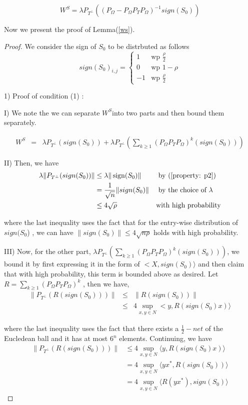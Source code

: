 \[
W^{S}=\lambda P_{T^{\bot}}((P_{\Omega}-P_{\Omega}P_{T}P_{\Omega})^{-1}sign(S_{0}))
\]

Now we present the proof of Lemma(\ref{ws}).
\begin{proof}
We consider the sign of $S_{0}$ to be distrbuted as follows
\[
sign(S_{0})_{i,j}=\begin{cases}
1 & \text{wp }\frac{\rho}{2}\\
0 & \text{wp }1-\rho\\
-1 & \text{wp }\frac{\rho}{2}
\end{cases}
\]


1) Proof of condition (1) :

I) We note the we can separate $W^{S}$into two parts and then bound them separately.

\begin{eqnarray*}
W^{S} & = & \lambda P_{T^{\bot}}(sign(S_{0}))+\lambda P_{T^{\bot}}(\sum_{k\ge1}(P_{\Omega}P_{T}P_{\Omega})^{k}(sign(S_{0})))
\end{eqnarray*}


II) Then, we have
\begin{align*}
\lambda \| P_{T^{\bot}}(sign(S_{0})) \|
& \le \lambda\| \operatorname{sign}(S_{0}) \|  &&\text{ by (\ref{property: p2})}\\
& = \frac{1}{\sqrt{n}}\|sign(S_{0})\| &&\text{ by the choice of }  \lambda\\
& \le 4\sqrt{\rho} &&\text{with high probability}
\end{align*}


where the last inequality uses the fact that for the entry-wise distribution of $sign(S_{0}$) , we can have $\|sign(S_{0})\|\le4\sqrt{n\rho}$ holds with high probability.

III) Now, for the other part, $\lambda P_{T^{\bot}}(\sum_{k\ge1}(P_{\Omega}P_{T}P_{\Omega})^{k}(sign(S_{0})))$, we bound it by first expressing it in the form of $<X,sign(S_{0})\rangle$ and then claim that with high probability, this term is bounded above as desired. Let $R=\sum_{k\ge1}(P_{\Omega}P_{T}P_{\Omega})^{k}$ ,
then we have,
\begin{eqnarray*}
\|P_{T^{\bot}}(R(sign(S_{0})))\| & \le & \|R(sign(S_{0}))\|\\
 & \le & 4\sup_{x,y\in N}<y,R(sign(S_{0})x)\rangle
\end{eqnarray*}


where the last inequality uses the fact that there exists a $\frac{1}{2}-net$ of the Eucledean ball and it has at most $6^{n}$ elements. Continuing, we have
\begin{align}
\|P_{T^{\bot}}(R(sign(S_{0})))\|
& \le 4\sup_{x,y \in N} \langle y,R(sign(S_{0})x) \rangle \nonumber \\
& = 4\sup_{x,y \in N} \langle yx^{*},R(sign(S_{0})) \rangle \nonumber \\
& = 4\sup_{x,y \in N} \langle R(yx^{*}),sign(S_{0}) \rangle
\label{net}
\end{align}



\end{proof}
